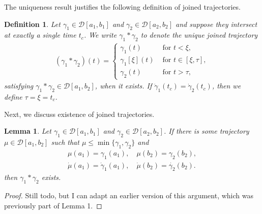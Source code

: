 \documentclass[a4paper]{article}
\theoremstyle{definition}
\newtheorem{remark}{Remark}
\theoremstyle{plain}
\newtheorem{define}{Definition\hspace{0.25em}\ignorespaces}
\newtheorem{lemma}{Lemma\hspace{0.25em}\ignorespaces}
\begin{document}

The uniqueness result justifies the following definition of joined trajectories.

\begin{define}
  Let $\gamma_{1} \in \mathcal{D}[a_{1}, b_{1}]$ and
  $\gamma_{2} \in \mathcal{D}[a_{2}, b_{2}]$ and suppose they intersect at
  exactly a single time $t_{c}$. We write $\gamma_{1} * \gamma_{2}$ to denote
  the unique \emph{joined trajectory}
  \begin{align}
    (\gamma_{1} * \gamma_{2})(t) =
    \begin{cases}
      \gamma_{1}(t) & \text{ for } t < \xi , \\
      \gamma_{1}[\xi](t) & \text{ for } t \in [\xi, \tau] , \\
      \gamma_{2}(t) & \text{ for } t > \tau ,
    \end{cases}
  \end{align}
  satisfying $\gamma_{1} * \gamma_{2} \in \mathcal{D}[a_{1}, b_{2}]$, when it exists.
  If $\dot{\gamma}_{1}(t_{c}) = \dot{\gamma}_{2}(t_{c})$, then we define $\tau=\xi=t_{c}$.
\end{define}

Next, we discuss existence of joined trajectories.

\begin{lemma}
  Let $\gamma_{1} \in \mathcal{D}[a_{1}, b_{1}]$ and
  $\gamma_{2} \in \mathcal{D}[a_{2},b_{2}]$. If there is some trajectory
  $\mu \in \mathcal{D}[a_{1}, b_{2}]$ such that
  $\mu \leq \min\{\gamma_{1}, \gamma_{2}\}$ and
  \begin{align*}
    \mu(a_{1}) = \gamma_{1}(a_{1}), \quad \mu(b_{2}) = \gamma_{2}(b_{2}), \\
    \dot{\mu}(a_{1}) = \dot{\gamma}_{1}(a_{1}), \quad \dot{\mu}(b_{2}) = \dot{\gamma_{2}}(b_{2}).
  \end{align*}
  then $\gamma_{1} * \gamma_{2}$ exists.
\end{lemma}
\begin{proof} {\color{Navy} Still todo, but I can adapt an earlier version of
    this argument, which was previously part of Lemma 1.}
\end{proof}
\end{document}
